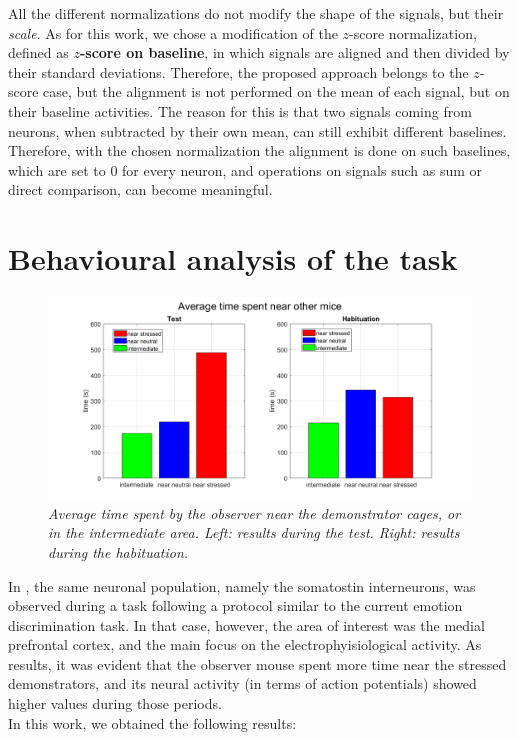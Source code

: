 \documentclass[12pt, a4paper]{report}
\begin{document}
All the different normalizations do not modify the shape of the signals, but their \textit{scale}. As for this work, we chose a modification of the $z$-score normalization, defined as \textbf{$z$-score on baseline}, in which signals are aligned and then divided by their standard deviations. Therefore, the proposed approach belongs to the $z$-score case, but the alignment is not performed on the mean of each signal, but on their baseline activities. The reason for this is that two signals coming from neurons, when subtracted by their own mean, can still exhibit different baselines. Therefore, with the chosen normalization the alignment is done on such baselines, which are set to $0$ for every neuron, and operations on signals such as sum or direct comparison, can become meaningful.



\section{Behavioural analysis of the task}


\begin{figure}[H]
	
	\centering
	
	\hspace*{-1 cm}
	\includegraphics[scale=.45]{times.png} 
	\caption{\textit{Average time spent by the observer near the demonstrator cages, or in the intermediate area. Left: results during the test. Right: results during the habituation. }} \label{times}
	
\end{figure}

In \cite{8}, the same neuronal population, namely the somatostin interneurons, was observed during a task following a protocol similar to the current emotion discrimination task. In that case, however, the area of interest was the medial prefrontal cortex, and the main focus on the electrophyisiological activity. As results, it was evident that the observer mouse spent more time near the stressed demonstrators, and its neural activity (in terms of action potentials) showed higher values during those periods.\\
In this work, we obtained the following results:
\end{document}
